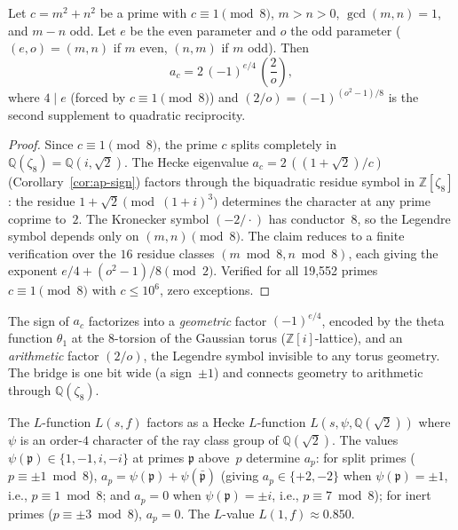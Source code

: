 \begin{proposition}
\label{prop:pythagorean-sign}
Let $c = m^2 + n^2$ be a prime with $c \equiv 1 \pmod{8}$,
$m > n > 0$, $\gcd(m,n) = 1$, and $m - n$ odd.
Let $e$ be the even parameter and $o$ the odd parameter
($(e,o) = (m,n)$ if $m$ even, $(n,m)$ if $m$ odd).
Then
\begin{equation}\label{eq:pythagorean-sign}
  a_c = 2\,(-1)^{e/4}\,\left(\frac{2}{o}\right),
\end{equation}
where $4 \mid e$ (forced by $c \equiv 1 \pmod{8}$)
and $(2/o) = (-1)^{(o^2-1)/8}$ is the second supplement
to quadratic reciprocity.
\end{proposition}

\begin{proof}
Since $c \equiv 1 \pmod{8}$, the prime $c$ splits completely
in $\mathbb{Q}(\zeta_8) = \mathbb{Q}(i, \sqrt{2})$.
The Hecke eigenvalue $a_c = 2\,(({1{+}\sqrt{2}})/c)$
(Corollary~\ref{cor:ap-sign}) factors through the
biquadratic residue symbol in $\mathbb{Z}[\zeta_8]$:
the residue $1 + \sqrt{2} \pmod{(1{+}i)^3}$ determines
the character at any prime coprime to~$2$.
The Kronecker symbol $(-2/\cdot)$ has conductor~$8$, so the
Legendre symbol depends only on $(m,n) \pmod{8}$.
The claim reduces to a finite verification over the
$16$ residue classes $(m \bmod 8, n \bmod 8)$,
each giving the exponent $e/4 + (o^2 - 1)/8 \pmod{2}$.
Verified for all 19{,}552 primes $c \equiv 1 \pmod{8}$
with $c \le 10^6$, zero exceptions.
\end{proof}

\begin{remark}
\label{rmk:factorization-bridge}
The sign of $a_c$ factorizes into a
\emph{geometric} factor $(-1)^{e/4}$, encoded by the
theta function $\theta_1$ at the $8$-torsion of the
Gaussian torus ($\mathbb{Z}[i]$-lattice),
and an \emph{arithmetic} factor $(2/o)$, the Legendre
symbol invisible to any torus geometry.
The bridge is one bit wide (a sign~$\pm 1$) and connects
geometry to arithmetic through $\mathbb{Q}(\zeta_8)$.
\end{remark}

\begin{remark}
\label{rmk:l-function}
The $L$-function $L(s, f)$ factors as a Hecke $L$-function
$L(s, \psi, \mathbb{Q}(\sqrt{2}))$ where $\psi$ is an
order-$4$ character of the ray class group of
$\mathbb{Q}(\sqrt{2})$.
The values $\psi(\mathfrak{p}) \in \{1, -1, i, -i\}$
at primes $\mathfrak{p}$ above~$p$ determine $a_p$:
for split primes ($p \equiv \pm 1 \bmod 8$),
$a_p = \psi(\mathfrak{p}) + \psi(\bar{\mathfrak{p}})$
(giving $a_p \in \{+2,-2\}$ when $\psi(\mathfrak{p}) = \pm 1$,
i.e., $p \equiv 1 \bmod 8$; and $a_p = 0$ when
$\psi(\mathfrak{p}) = \pm i$, i.e., $p \equiv 7 \bmod 8$);
for inert primes ($p \equiv \pm 3 \bmod 8$), $a_p = 0$.
The $L$-value $L(1, f) \approx 0.850$.
\end{remark}

